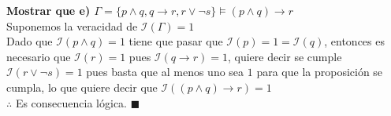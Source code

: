\textbf{Mostrar que e) $\Gamma = \{p\land q, q\rightarrow r, r \lor \neg s\}\vDash (p \land q)\rightarrow r$}\\
Suponemos la veracidad de $\mathcal{I}(\Gamma)=1$\\
Dado que $\mathcal{I}(p\land q)=1$ tiene que pasar que $\mathcal{I}(p)=1=\mathcal{I}(q)$, entonces es necesario que $\mathcal{I}(r)=1$ pues $\mathcal{I}(q\rightarrow r)=1$, quiere decir se cumple 
$\mathcal{I}(r \lor \neg s)=1$ pues basta que al menos uno sea $1$ para que la proposición se cumpla, lo que quiere decir que $\mathcal{I}((p\land q)\rightarrow r)=1$\\
$\therefore$ Es consecuencia lógica. $\blacksquare$